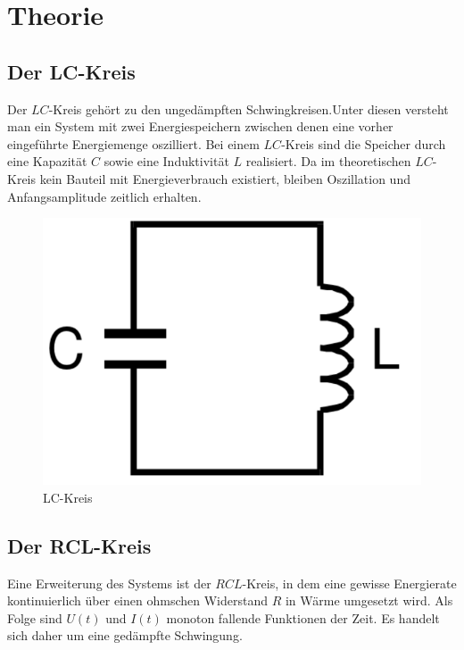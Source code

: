 \section{Theorie}
\label{sec:Theorie}


\subsection{Der LC-Kreis}
Der $LC$-Kreis gehört zu den ungedämpften Schwingkreisen.Unter diesen versteht man
 ein System mit zwei Energiespeichern zwischen denen eine vorher eingeführte Energiemenge
  oszilliert. Bei einem $LC$-Kreis sind die Speicher durch eine Kapazität $C$ sowie
  eine Induktivität $L$ realisiert. Da im theoretischen $LC$-Kreis kein Bauteil mit Energieverbrauch
   existiert, bleiben Oszillation und Anfangsamplitude zeitlich erhalten.

   \begin{figure}[H]
     \centering
     \includegraphics[width=\linewidth-300pt,height=\textheight-300pt,keepaspectratio]{content/CL.png}
     \caption{LC-Kreis}
     \label{fig:CL_Kreis}
   \end{figure}

   \subsection{Der RCL-Kreis}
Eine Erweiterung des Systems ist der $RCL$-Kreis, in dem eine gewisse Energierate
kontinuierlich über einen ohmschen Widerstand $R$ in Wärme umgesetzt wird. Als Folge sind
$U(t)$ und $I(t)$  monoton fallende Funktionen der Zeit. Es handelt sich daher um eine gedämpfte
 Schwingung.

